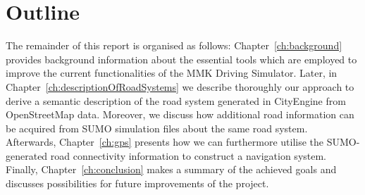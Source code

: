 \section{Outline}
\label{sec:outline}
The remainder of this report is organised as follows: Chapter~\ref{ch:background} provides background information about the essential tools which are employed to improve the current functionalities of the MMK Driving Simulator. Later, in Chapter~\ref{ch:descriptionOfRoadSystems} we describe thoroughly our approach to derive a semantic description of the road system generated in CityEngine from OpenStreetMap data. Moreover, we discuss how additional road information can be acquired from SUMO simulation files about the same road system. Afterwards, Chapter~\ref{ch:gps} presents how we can furthermore utilise the SUMO-generated road connectivity information to construct a navigation system. Finally, Chapter~\ref{ch:conclusion} makes a summary of the achieved goals and discusses possibilities for future improvements of the project.
